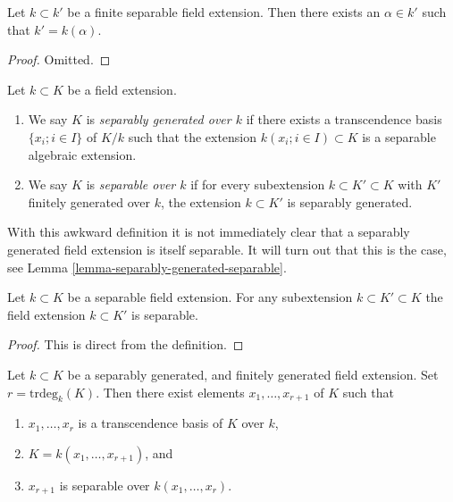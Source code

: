 \begin{lemma}
\label{lemma-finite-separable}
Let $k \subset k'$ be a finite separable field extension.
Then there exists an $\alpha \in k'$ such that $k' = k(\alpha)$.
\end{lemma}

\begin{proof}
Omitted.
\end{proof}

\begin{definition}
\label{definition-separable-field-extension}
Let $k \subset K$ be a field extension.
\begin{enumerate}
\item We say $K$ is {\it separably generated over $k$} if there exists
a transcendence basis $\{x_i; i \in I\}$ of $K/k$ such that the extension
$k(x_i; i\in I) \subset K$ is a separable algebraic extension.
\item We say $K$ is {\it separable over $k$} if for every subextension
$k \subset K' \subset K$ with $K'$ finitely generated
over $k$, the extension $k \subset K'$ is separably generated.
\end{enumerate}
\end{definition}

\noindent
With this awkward definition it is not immediately clear that
a separably generated field extension is itself separable.
It will turn out that this is the case, see
Lemma \ref{lemma-separably-generated-separable}.

\begin{lemma}
\label{lemma-subextensions-are-separable}
Let $k \subset K$ be a separable field extension.
For any subextension $k \subset K' \subset K$ the field
extension $k \subset K'$ is separable.
\end{lemma}

\begin{proof}
This is direct from the definition.
\end{proof}

\begin{lemma}
\label{lemma-generating-finitely-generated-separable-field-extensions}
Let $k \subset K$ be a separably generated, and finitely generated
field extension.
Set $r = \text{trdeg}_k(K)$. Then there exist elements
$x_1, \ldots, x_{r + 1}$ of $K$ such that
\begin{enumerate}
\item $x_1, \ldots, x_r$ is a transcendence basis of $K$ over $k$,
\item $K = k(x_1, \ldots, x_{r + 1})$, and
\item $x_{r + 1}$ is separable over $k(x_1, \ldots, x_r)$.
\end{enumerate}
\end{lemma}

